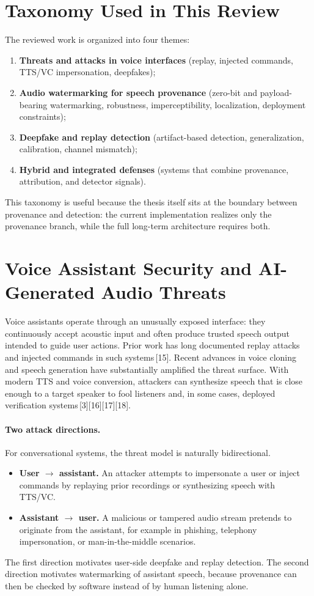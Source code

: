 \section{Taxonomy Used in This Review}
The reviewed work is organized into four themes:
\begin{enumerate}[leftmargin=1.25em]
  \item \textbf{Threats and attacks in voice interfaces} (replay, injected commands, TTS/VC impersonation, deepfakes);
  \item \textbf{Audio watermarking for speech provenance} (zero-bit and payload-bearing watermarking, robustness, imperceptibility, localization, deployment constraints);
  \item \textbf{Deepfake and replay detection} (artifact-based detection, generalization, calibration, channel mismatch);
  \item \textbf{Hybrid and integrated defenses} (systems that combine provenance, attribution, and detector signals).
\end{enumerate}
This taxonomy is useful because the thesis itself sits at the boundary between provenance and detection: the current implementation realizes only the provenance branch, while the full long-term architecture requires both.

\section{Voice Assistant Security and AI-Generated Audio Threats}
Voice assistants operate through an unusually exposed interface: they continuously accept acoustic input and often produce trusted speech output intended to guide user actions. Prior work has long documented replay attacks and injected commands in such systems\,[15]. Recent advances in voice cloning and speech generation have substantially amplified the threat surface. With modern TTS and voice conversion, attackers can synthesize speech that is close enough to a target speaker to fool listeners and, in some cases, deployed verification systems\,[3][16][17][18].

\paragraph{Two attack directions.}
For conversational systems, the threat model is naturally bidirectional.
\begin{itemize}[leftmargin=1.25em]
  \item \textbf{User $\rightarrow$ assistant.} An attacker attempts to impersonate a user or inject commands by replaying prior recordings or synthesizing speech with TTS/VC.
  \item \textbf{Assistant $\rightarrow$ user.} A malicious or tampered audio stream pretends to originate from the assistant, for example in phishing, telephony impersonation, or man-in-the-middle scenarios.
\end{itemize}
The first direction motivates user-side deepfake and replay detection. The second direction motivates watermarking of assistant speech, because provenance can then be checked by software instead of by human listening alone.

